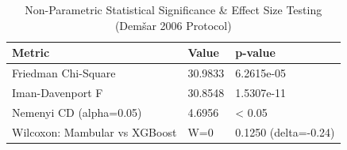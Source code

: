 \begin{table}[t]
\centering
\caption{Non-Parametric Statistical Significance & Effect Size Testing (Demšar 2006 Protocol)}
\label{tab:statistical_validation}
\small
\begin{tabular}{lll}
\toprule
Metric & Value & p-value \\
\midrule
Friedman Chi-Square & 30.9833 & 6.2615e-05 \\
Iman-Davenport F & 30.8548 & 1.5307e-11 \\
Nemenyi CD (alpha=0.05) & 4.6956 & < 0.05 \\
Wilcoxon: Mambular vs XGBoost & W=0 & 0.1250 (delta=-0.24) \\
\bottomrule
\end{tabular}

\end{table}
